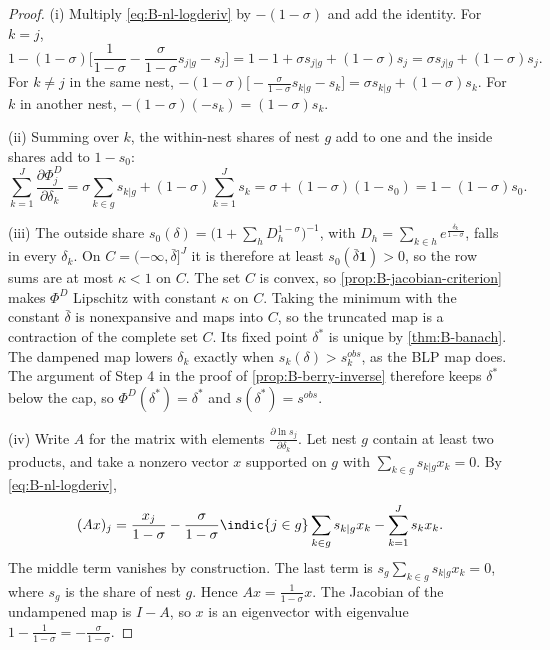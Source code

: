 \begin{proof}
(i) Multiply \eqref{eq:B-nl-logderiv} by $-(1 - \sigma)$ and add the identity. For $k = j$,
\begin{equation*}
  1 - (1 - \sigma)\Big[\frac{1}{1-\sigma} - \frac{\sigma}{1-\sigma}s_{j|g} - s_j\Big] = 1 - 1 + \sigma s_{j|g}
  + (1 - \sigma)s_j = \sigma s_{j|g} + (1 - \sigma)s_j.
\end{equation*}
For $k \neq j$ in the same nest, $-(1 - \sigma)\big[-\frac{\sigma}{1-\sigma}s_{k|g} - s_k\big] = \sigma
s_{k|g} + (1 - \sigma)s_k$. For $k$ in another nest, $-(1 - \sigma)(-s_k) = (1 - \sigma)s_k$.

(ii) Summing over $k$, the within-nest shares of nest $g$ add to one and the inside shares add to $1 - s_0$:
\begin{equation*}
  \sum_{k=1}^{J}\frac{\partial\Phi^D_j}{\partial\delta_k} = \sigma\sum_{k \in g}s_{k|g} + (1 -
  \sigma)\sum_{k=1}^{J}s_k = \sigma + (1 - \sigma)(1 - s_0) = 1 - (1 - \sigma)s_0.
\end{equation*}

(iii) The outside share $s_0(\delta) = \big(1 + \sum_hD_h^{1-\sigma}\big)^{-1}$, with $D_h = \sum_{k \in
h}e^{\frac{\delta_k}{1-\sigma}}$, falls in every $\delta_k$. On $C = (-\infty, \bar\delta]^J$ it is therefore
at least $s_0(\bar\delta\mathbf{1}) > 0$, so the row sums are at most $\kappa < 1$ on $C$. The set $C$ is
convex, so \cref{prop:B-jacobian-criterion} makes $\Phi^D$ Lipschitz with constant $\kappa$ on $C$. Taking the
minimum with the constant $\bar\delta$ is nonexpansive and maps into $C$, so the truncated map is a
contraction of the complete set $C$. Its fixed point $\delta^*$ is unique by \cref{thm:B-banach}. The
dampened map lowers $\delta_k$ exactly when $s_k(\delta) > s^{obs}_k$, as the BLP map does. The argument of
Step 4 in the proof of \cref{prop:B-berry-inverse} therefore keeps $\delta^*$ below the cap, so $\Phi^D(\delta^*)
= \delta^*$ and $s(\delta^*) = s^{obs}$.

(iv) Write $A$ for the matrix with elements $\frac{\partial\ln s_j}{\partial\delta_k}$. Let nest $g$ contain
at least two products, and take a nonzero vector $x$ supported on $g$ with $\sum_{k \in g}s_{k|g}x_k = 0$. By
\eqref{eq:B-nl-logderiv},
\begin{equation*}
  (Ax)_j = \frac{x_j}{1-\sigma} - \frac{\sigma}{1-\sigma}\indic\{j \in g\}\sum_{k \in g}s_{k|g}x_k -
  \sum_{k=1}^{J}s_kx_k.
\end{equation*}
The middle term vanishes by construction. The last term is $s_g\sum_{k \in g}s_{k|g}x_k = 0$, where $s_g$ is
the share of nest $g$. Hence $Ax = \frac{1}{1-\sigma}x$. The Jacobian of the undampened map is $I - A$, so
$x$ is an eigenvector with eigenvalue $1 - \frac{1}{1-\sigma} = -\frac{\sigma}{1-\sigma}$.
\end{proof}

